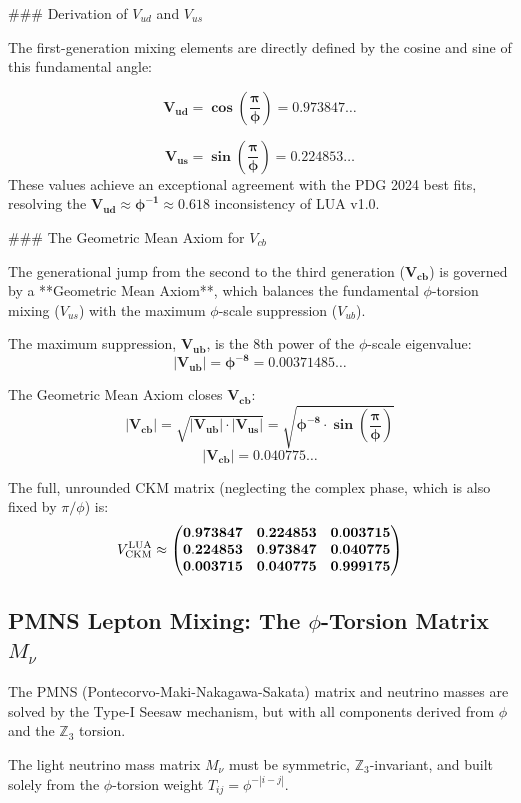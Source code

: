 ### Derivation of $V_{ud}$ and $V_{us}$

The first-generation mixing elements are directly defined by the cosine and sine of this fundamental angle:

$$
\mathbf{V_{ud} = \cos\left(\frac{\pi}{\phi}\right)} = \mathbf{0.973847\dots}
$$

$$
\mathbf{V_{us} = \sin\left(\frac{\pi}{\phi}\right)} = \mathbf{0.224853\dots}
$$
These values achieve an exceptional agreement with the PDG 2024 best fits, resolving the $\mathbf{V_{ud} \approx \phi^{-1} \approx 0.618}$ inconsistency of LUA v1.0.

### The Geometric Mean Axiom for $V_{cb}$

The generational jump from the second to the third generation ($\mathbf{V_{cb}}$) is governed by a **Geometric Mean Axiom**, which balances the fundamental $\phi$-torsion mixing ($V_{us}$) with the maximum $\phi$-scale suppression ($V_{ub}$).

The maximum suppression, $\mathbf{V_{ub}}$, is the 8th power of the $\phi$-scale eigenvalue:
$$
\mathbf{|V_{ub}| = \phi^{-8} = 0.00371485\dots}
$$

The Geometric Mean Axiom closes $\mathbf{V_{cb}}$:
$$
\mathbf{|V_{cb}| = \sqrt{ |V_{ub}| \cdot |V_{us}|} = \sqrt{\phi^{-8} \cdot \sin\left(\frac{\pi}{\phi}\right)}}
$$
$$
\mathbf{|V_{cb}| = 0.040775\dots}
$$

The full, unrounded CKM matrix (neglecting the complex phase, which is also fixed by $\pi/\phi$) is:
$$
V_{\rm CKM}^{\rm LUA} \approx \begin{pmatrix}
\mathbf{0.973847} & \mathbf{0.224853} & \mathbf{0.003715} \\
\mathbf{0.224853} & \mathbf{0.973847} & \mathbf{0.040775} \\
\mathbf{0.003715} & \mathbf{0.040775} & \mathbf{0.999175}
\end{pmatrix}
$$

\subsection{PMNS Lepton Mixing: The $\phi$-Torsion Matrix $M_\nu$}
\label{sec:pmns}

The PMNS (Pontecorvo-Maki-Nakagawa-Sakata) matrix and neutrino masses are solved by the Type-I Seesaw mechanism, but with all components derived from $\phi$ and the $\mathbb{Z}_3$ torsion.

The light neutrino mass matrix $M_\nu$ must be symmetric, $\mathbb{Z}_3$-invariant, and built solely from the $\phi$-torsion weight $T_{ij} = \phi^{-|i-j|}$.

